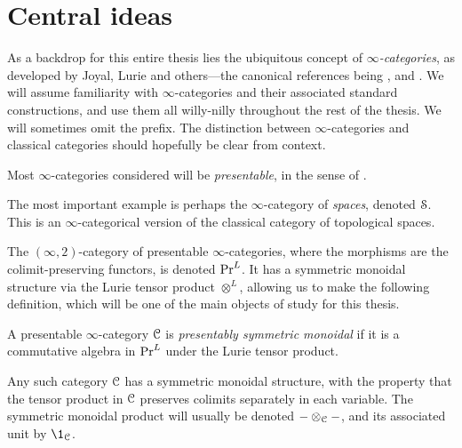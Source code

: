 
\section{Central ideas}
\label{ch0:sec:Central-ideas}

As a backdrop for this entire thesis lies the ubiquitous concept of \emph{$\infty$-categories}, as developed by Joyal, Lurie and others---the canonical references being \cite{joyal_02}, \cite{lurie_09} and \cite{Lurie_HA}. We will assume familiarity with $\infty$-categories and their associated standard constructions, and use them all willy-nilly throughout the rest of the thesis. We will sometimes omit the prefix. The distinction between $\infty$-categories and classical categories should hopefully be clear from context.  

Most $\infty$-categories considered will be \emph{presentable}, in the sense of \cite[Chapter 5]{lurie_09}. 

\begin{example}
    The most important example is perhaps the $\infty$-category of \emph{spaces}, denoted $\EuScript{S}$. This is an $\infty$-categorical version of the classical category of topological spaces. 
\end{example}

The $(\infty, 2)$-category of presentable $\infty$-categories, where the morphisms are the colimit-preserving functors, is denoted $\mathrm{Pr}^L$. It has a symmetric monoidal structure via the Lurie tensor product $\otimes^L$, allowing us to make the following definition, which will be one of the main objects of study for this thesis. 

\begin{definition}
    A presentable $\infty$-category $\EuScript{C}$ is \emph{presentably symmetric monoidal} if it is a commutative algebra in $\mathrm{Pr}^L$ under the Lurie tensor product. 
\end{definition}

Any such category $\EuScript{C}$ has a symmetric monoidal structure, with the property that the tensor product in $\EuScript{C}$ preserves colimits separately in each variable. The symmetric monoidal product will usually be denoted $-\otimes_{\EuScript{C}} -$, and its associated unit by $\1_\C$. 

